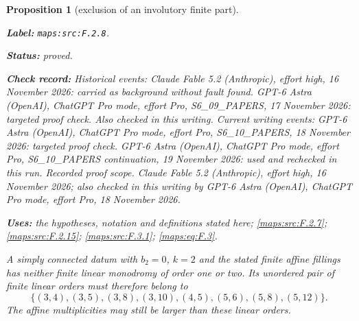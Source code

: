 \documentclass[11pt,a4paper]{article}
\newtheorem{proposition}[proposition]{Proposition}
\theoremstyle{definition}
\newcommand{\StatementRecord}[4]{\par\smallskip\begingroup\upshape\raggedright\noindent\textbf{Label:} \nolinkurl{#1}.\par\noindent\textbf{Status:} #2.\par\noindent\textbf{Check record:} #3.\par\noindent\textbf{Uses:} #4.\par\endgroup\smallskip}
\begin{document}
\begin{proposition}[exclusion of an involutory finite part]\label{maps:src:F.2.8}
\StatementRecord{maps:src:F.2.8}{proved}{Historical events: Claude Fable 5.2 (Anthropic), effort high, 16 November 2026: carried as background without fault found. GPT-6 Astra (OpenAI), ChatGPT Pro mode, effort Pro, S6\_09\_PAPERS, 17 November 2026: targeted proof check. Also checked in this writing. Current writing events: GPT-6 Astra (OpenAI), ChatGPT Pro mode, effort Pro, S6\_10\_PAPERS, 18 November 2026: targeted proof check. GPT-6 Astra (OpenAI), ChatGPT Pro mode, effort Pro, S6\_10\_PAPERS continuation, 19 November 2026: used and rechecked in this run. \emph{Recorded proof scope.} Claude Fable 5.2 (Anthropic), effort high, 16 November 2026; also checked in this writing by GPT-6 Astra (OpenAI), ChatGPT Pro mode, effort Pro, 18 November 2026}{the hypotheses, notation and definitions stated here; \cref{maps:src:F.2.7}; \cref{maps:src:F.2.15}; \cref{maps:src:F.3.1}; \cref{maps:eq:F.3}}


A simply connected datum with $b_2=0$, $k=2$ and the stated
finite affine fillings has neither finite linear
monodromy of order one or two.  Its unordered pair of finite
linear orders must therefore belong to
\[
 \{(3,4),(3,5),(3,8),(3,10),(4,5),
       (5,6),(5,8),(5,12)\}.
 \tag{F.28}\label{maps:eq:F.28}
\]
The affine multiplicities may still be larger than these
linear orders.

\end{proposition}
\end{document}
